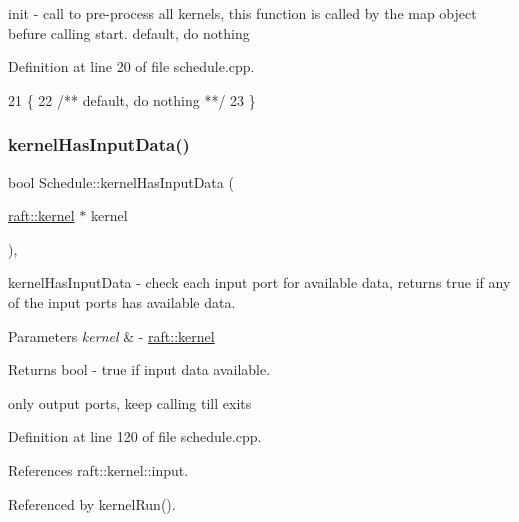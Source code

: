 init -\/ call to pre-\/process all kernels, this function is called by the map object befure calling start. default, do nothing 

Definition at line 20 of file schedule.\+cpp.


\begin{DoxyCode}
21 \{\textcolor{comment}{}
22 \textcolor{comment}{   /** default, do nothing **/}
23 \}
\end{DoxyCode}
\hypertarget{class_schedule_ac23de3dd63554401fd0d8d23b60eecfa}{}\label{class_schedule_ac23de3dd63554401fd0d8d23b60eecfa} 
\subsubsection{\texorpdfstring{kernel\+Has\+Input\+Data()}{kernelHasInputData()}}
{\footnotesize\ttfamily bool Schedule\+::kernel\+Has\+Input\+Data (\begin{DoxyParamCaption}\item[{\hyperlink{classraft_1_1kernel}{raft\+::kernel} $\ast$}]{kernel }\end{DoxyParamCaption})\hspace{0.3cm}{\ttfamily [static]}, {\ttfamily [protected]}}

kernel\+Has\+Input\+Data -\/ check each input port for available data, returns true if any of the input ports has available data. 
\begin{DoxyParams}{Parameters}
{\em kernel} & -\/ \hyperlink{classraft_1_1kernel}{raft\+::kernel} \\
\hline
\end{DoxyParams}
\begin{DoxyReturn}{Returns}
bool -\/ true if input data available. 
\end{DoxyReturn}
only output ports, keep calling till exits 

Definition at line 120 of file schedule.\+cpp.



References raft\+::kernel\+::input.



Referenced by kernel\+Run().


